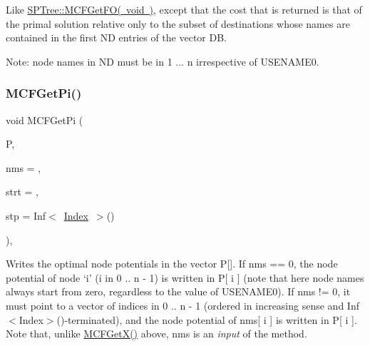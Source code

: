 Like \mbox{\hyperlink{class_s_p_tree_a55b9b095d557852a91b68c973236518a}{S\+P\+Tree\+::\+M\+C\+F\+Get\+F\+O( void )}}, except that the cost that is returned is that of the primal solution relative only to the subset of destinations whose names are contained in the first ND entries of the vector DB.

Note\+: node names in ND must be in 1 ... n irrespective of U\+S\+E\+N\+A\+M\+E0. \mbox{\label{class_s_p_tree_a59f02d7f6b2b033bf7a9c45774a26397}} 
\subsubsection{\texorpdfstring{M\+C\+F\+Get\+Pi()}{MCFGetPi()}\hspace{0.1cm}{\footnotesize\ttfamily [1/2]}}
{\footnotesize\ttfamily void M\+C\+F\+Get\+Pi (\begin{DoxyParamCaption}\item[{\mbox{\hyperlink{class_m_c_f_class_a62409402be4e4b301e1a568f99f877be}{C\+Row}}}]{P,  }\item[{\mbox{\hyperlink{class_m_c_f_class_a81575b2d4e4d5636b17170432150ae69}{c\+Index\+\_\+\+Set}}}]{nms = {},  }\item[{\mbox{\hyperlink{class_m_c_f_class_a76aaabb20535c51a2752b93f6c38fe54}{c\+Index}}}]{strt = {},  }\item[{\mbox{\hyperlink{class_m_c_f_class_ad53d6229d7ec28555a9c9c2fd9abf773}{Index}}}]{stp = {\ttfamily Inf$<$~\mbox{\hyperlink{class_m_c_f_class_ad53d6229d7ec28555a9c9c2fd9abf773}{Index}}~$>$()} }\end{DoxyParamCaption})\hspace{0.3cm}{\ttfamily [override]}, {\ttfamily [virtual]}}

Writes the optimal node potentials in the vector P\mbox{[}\mbox{]}. If nms == 0, the node potential of node `i' (i in 0 .. n -\/ 1) is written in P\mbox{[} i \mbox{]} (note that here node names always start from zero, regardless to the value of U\+S\+E\+N\+A\+M\+E0). If nms != 0, it must point to a vector of indices in 0 .. n -\/ 1 (ordered in increasing sense and Inf$<$\+Index$>$()-\/terminated), and the node potential of nms\mbox{[} i \mbox{]} is written in P\mbox{[} i \mbox{]}. Note that, unlike \mbox{\hyperlink{class_m_c_f_class_a4eb307e0707adaef99bb0e08c9e10eb8}{M\+C\+F\+Get\+X()}} above, nms is an {\itshape input} of the method.

